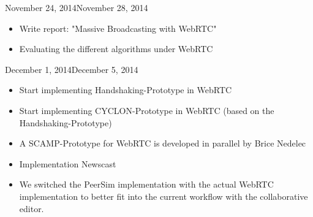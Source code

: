 \documentclass[11pt, english, screen]{report-rd-info}
\begin{document}
\begin{fichesuivi}{November 24, 2014}{November 28, 2014}

   \begin{travaileffectue}
      \begin{itemize}
   \item {Write report: "Massive Broadcasting with WebRTC"}
      \end{itemize}
   \end{travaileffectue}

   \begin{travailnoneffectue}
   \end{travailnoneffectue}

   \begin{echange}
   \end{echange}

   \begin{planification}
      \begin{itemize}
   \item {Evaluating the different algorithms under WebRTC}
      \end{itemize}
   \end{planification}
\end{fichesuivi}

\begin{fichesuivi}{December 1, 2014}{December 5, 2014}

   \begin{travaileffectue}
   \begin{itemize}
   \item {Start implementing Handshaking-Prototype in WebRTC}
   \item {Start implementing CYCLON-Prototype in WebRTC (based on the Handshaking-Prototype)}
   \item {A SCAMP-Prototype for WebRTC is developed in parallel by Brice Nedelec}
      \end{itemize}
   \end{travaileffectue}

   \begin{travailnoneffectue}
    \begin{itemize}
   \item {Implementation Newscast}
      \end{itemize}
   \end{travailnoneffectue}

   \begin{echange}
   \begin{itemize}
   \item {We switched the PeerSim implementation with the actual WebRTC implementation to better fit into the current workflow with the collaborative editor. }
      \end{itemize}
   \end{echange}

   \begin{planification}
   \end{planification}
\end{fichesuivi}
\end{document}
